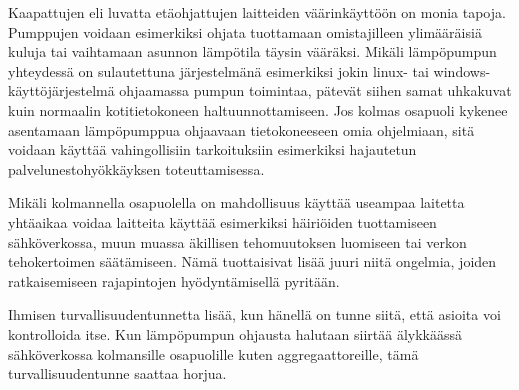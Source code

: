   Kaapattujen eli luvatta etäohjattujen laitteiden väärinkäyttöön on monia tapoja. Pumppujen voidaan esimerkiksi ohjata tuottamaan omistajilleen ylimääräisiä kuluja tai vaihtamaan asunnon lämpötila täysin vääräksi. Mikäli lämpöpumpun yhteydessä on sulautettuna järjestelmänä esimerkiksi jokin linux- tai windows-käyttöjärjestelmä ohjaamassa pumpun toimintaa, pätevät siihen samat uhkakuvat kuin normaalin kotitietokoneen haltuunnottamiseen. Jos kolmas osapuoli kykenee asentamaan lämpöpumppua ohjaavaan tietokoneeseen omia ohjelmiaan, sitä voidaan käyttää vahingollisiin tarkoituksiin esimerkiksi hajautetun palvelunestohyökkäyksen toteuttamisessa. 
  
  Mikäli kolmannella osapuolella on mahdollisuus käyttää useampaa laitetta yhtäaikaa voidaa laitteita käyttää esimerkiksi häiriöiden tuottamiseen sähköverkossa, muun muassa äkillisen tehomuutoksen luomiseen tai verkon tehokertoimen säätämiseen. Nämä tuottaisivat lisää juuri niitä ongelmia, joiden ratkaisemiseen rajapintojen hyödyntämisellä pyritään.

  Ihmisen turvallisuudentunnetta lisää, kun hänellä on tunne siitä, että asioita voi kontrolloida itse. Kun lämpöpumpun ohjausta halutaan siirtää älykkäässä sähköverkossa kolmansille osapuolille kuten aggregaattoreille, tämä turvallisuudentunne saattaa horjua.
